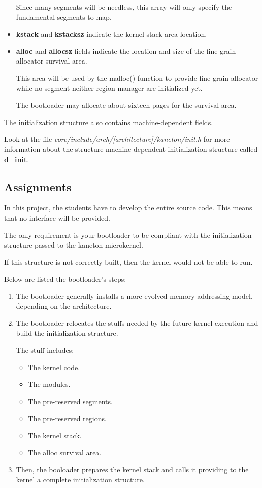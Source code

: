 \begin{itemize}
    Since many segments will be needless, this array will only specify the
    fundamental segments to map.
---
  \item
    \textbf{kstack} and \textbf{kstacksz} indicate the kernel stack
    area location.
  \item
    \textbf{alloc} and \textbf{allocsz} fields indicate the location
    and size of the fine-grain allocator survival area.

    This area will be used by the malloc() function to provide fine-grain
    allocator while no segment neither region manager are initialized
    yet.

    The bootloader may allocate about sixteen pages for the survival area.
\end{itemize}

The initialization structure also contains machine-dependent fields.

Look at the file \textit{core/include/arch/[architecture]/kaneton/init.h}
for more information about the structure machine-dependent initialization
structure called \textbf{d\_init}.

%
%

\subsection{Assignments}

In this project, the students have to develop the entire source code.
This means that no interface will be provided.

The only requirement is your bootloader to be compliant with the
initialization structure passed to the kaneton microkernel.

If this structure is not correctly built, then the kernel would not
be able to run.

Below are listed the bootloader's steps:

\begin{enumerate}
  \item
    The bootloader generally installs a more evolved memory addressing model,
    depending on the architecture.
  \item
    The bootloader relocates the stuffs needed by the future kernel
    execution and build the initialization structure.

    The stuff includes:

    \begin{itemize}
      \item
	The kernel code.
      \item
	The modules.
      \item
	The pre-reserved segments.
      \item
	The pre-reserved regions.
      \item
	The kernel stack.
      \item
	The alloc survival area.
    \end{itemize}
  \item
    Then, the booloader prepares the kernel stack and calls it providing
    to the kernel a complete initialization structure.
\end{enumerate}

